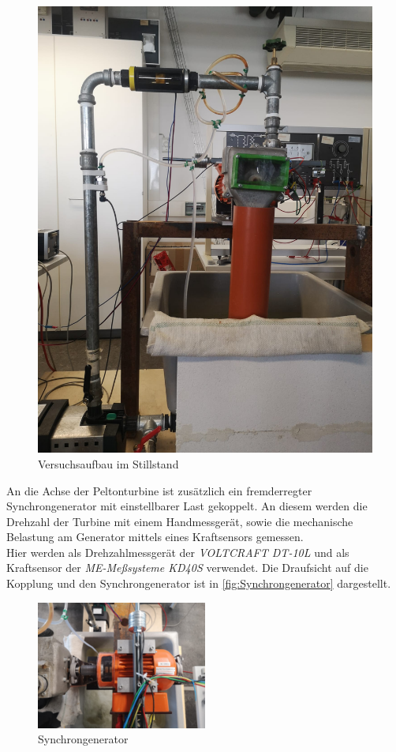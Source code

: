 \begin{figure}[!h]
    \centering
    \includegraphics[scale=0.125]{Abbildungen/Aufbau Pelton.jpeg}
    \caption{Versuchsaufbau im Stillstand}
    \label{fig:Aufbau_Stillstand}
\end{figure}

An die Achse der Peltonturbine ist zusätzlich ein fremderregter Synchrongenerator mit einstellbarer Last gekoppelt.
An diesem werden die Drehzahl der Turbine mit einem Handmessgerät, sowie die mechanische Belastung am Generator mittels eines Kraftsensors gemessen.\\
Hier werden als Drehzahlmessgerät der \textit{VOLTCRAFT DT-10L} und als Kraftsensor der \textit{ME-Meßsysteme KD40S} verwendet.
Die Draufsicht auf die Kopplung und den Synchrongenerator ist in \autoref{fig:Synchrongenerator} dargestellt.\\

\begin{figure}[H]
    \centering
    \includegraphics[width=0.5\textwidth]{Abbildungen/Generator.jpeg}
    \caption{Synchrongenerator}
    \label{fig:Synchrongenerator}
\end{figure}

